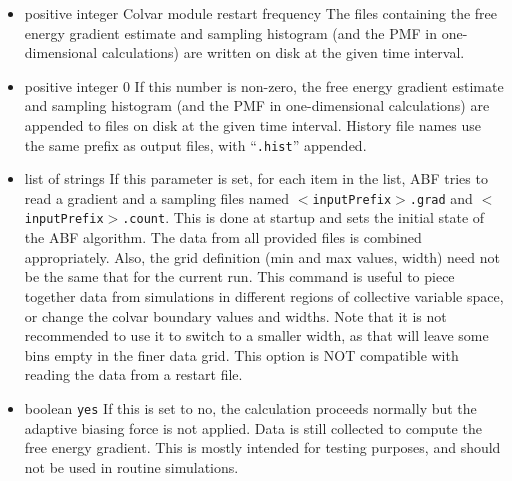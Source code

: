 \begin{itemize}
\item {}
  {positive integer}
  {Colvar module restart frequency}
  {The files containing the free energy gradient estimate and sampling histogram
    (and the PMF in one-dimensional calculations) are written on disk at the given
    time interval.}

\item {}
  {positive integer}
  {0}
  {If this number is non-zero, the free energy gradient estimate and sampling histogram
    (and the PMF in one-dimensional calculations) are appended to files on disk at
    the given time interval. History file names use the same prefix as output files, with
    ``\texttt{.hist}'' appended.}

\item {}
  {list of strings}
  {If this parameter is set, for each item in the list, ABF tries to read
    a gradient and a sampling files named \texttt{$<$inputPrefix$>$.grad}
    and \texttt{$<$inputPrefix$>$.count}. This is done at
    startup and sets the initial state of the ABF algorithm.
    The data from all provided files is combined appropriately.
    Also, the grid definition (min and max values, width) need not be the same
    that for the current run. This command is useful to piece together
    data from simulations in different regions of collective variable space,
    or change the colvar boundary values and widths. Note that it is not
    recommended to use it to switch to a smaller width, as that will leave
    some bins empty in the finer data grid.
    This option is NOT compatible with reading the data from a restart file.}

\item {}
  {boolean}
  {\texttt{yes}}
  { If this is set to no, the calculation proceeds normally but the adaptive
    biasing force is not applied. Data is still collected to compute
    the free energy gradient. This is mostly intended for testing purposes, and should
    not be used in routine simulations.
  }


\end{itemize}

